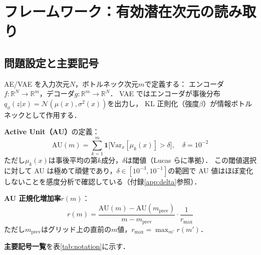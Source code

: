 \documentclass[11pt,a4paper]{jsarticle}
\newcommand{\R}{\mathbb{R}}
\begin{document}
\section{フレームワーク：有効潜在次元の読み取り}\label{sec:framework}

\subsection{問題設定と主要記号}\label{sec:framework_setup}

AE/VAE を入力次元$N$，ボトルネック次元$m$で定義する：
エンコーダ$f: \R^N \to \R^m$，デコーダ$g: \R^m \to \R^N$．
VAE ではエンコーダが事後分布$q_\phi(z|x) = \mathcal{N}(\mu(x), \sigma^2(x))$を出力し，
KL 正則化（強度$\beta$）が情報ボトルネックとして作用する．

\textbf{Active Unit（AU）}の定義：
\begin{equation}
  \mathrm{AU}(m) = \sum_{k=1}^{m} \mathbf{1}\bigl[\mathrm{Var}_x[\mu_k(x)] > \delta\bigr],
  \quad \delta = 10^{-2}
  \label{eq:au_def}
\end{equation}
ただし$\mu_k(x)$は事後平均の第$k$成分，$\delta$は閾値（Lucas ら\cite{lucas2019elbo}に準拠）．
この閾値選択に対して AU は極めて頑健であり，$\delta \in [10^{-3}, 10^{-1}]$の範囲で AU 値はほぼ変化しないことを感度分析で確認している（付録\ref{app:delta}参照）．

\textbf{AU 正規化増加率}$r(m)$：
\begin{equation}
  r(m) = \frac{\mathrm{AU}(m) - \mathrm{AU}(m_{\mathrm{prev}})}{m - m_{\mathrm{prev}}} \cdot \frac{1}{r_{\max}}
  \label{eq:au_rate}
\end{equation}
ただし$m_{\mathrm{prev}}$はグリッド上の直前の$m$値，$r_{\max} = \max_{m'} r(m')$．

\textbf{主要記号一覧}を表\ref{tab:notation}に示す．
\end{document}
